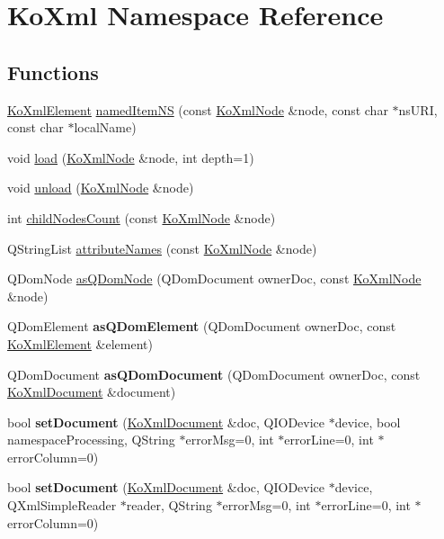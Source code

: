 \hypertarget{namespaceKoXml}{
\section{KoXml Namespace Reference}
\label{namespaceKoXml}
}
\subsection*{Functions}
\begin{DoxyCompactItemize}
\item 
\hyperlink{classKoXmlElement}{KoXmlElement} \hyperlink{namespaceKoXml_af571b501c9481cab08bbcf9b9174e4f5}{namedItemNS} (const \hyperlink{classKoXmlNode}{KoXmlNode} \&node, const char $\ast$nsURI, const char $\ast$localName)
\item 
void \hyperlink{namespaceKoXml_aaa2b101e7188f027c484537851115566}{load} (\hyperlink{classKoXmlNode}{KoXmlNode} \&node, int depth=1)
\item 
void \hyperlink{namespaceKoXml_a5834f749393cb5393257558484f8d2b9}{unload} (\hyperlink{classKoXmlNode}{KoXmlNode} \&node)
\item 
int \hyperlink{namespaceKoXml_a741654edec9f17c65760b32b45069dcc}{childNodesCount} (const \hyperlink{classKoXmlNode}{KoXmlNode} \&node)
\item 
QStringList \hyperlink{namespaceKoXml_a4859eaf343a885dc2c69889271e16b6a}{attributeNames} (const \hyperlink{classKoXmlNode}{KoXmlNode} \&node)
\item 
QDomNode \hyperlink{namespaceKoXml_aa9562d7b4abde19cd063e70ca966e582}{asQDomNode} (QDomDocument ownerDoc, const \hyperlink{classKoXmlNode}{KoXmlNode} \&node)
\item 
\hypertarget{namespaceKoXml_a9a009f9951bf7a5c4f1b83d6b1577bcc}{
QDomElement {\bfseries asQDomElement} (QDomDocument ownerDoc, const \hyperlink{classKoXmlElement}{KoXmlElement} \&element)}
\label{namespaceKoXml_a9a009f9951bf7a5c4f1b83d6b1577bcc}

\item 
\hypertarget{namespaceKoXml_aa4375111a0c208d32b1d7fa18ad59553}{
QDomDocument {\bfseries asQDomDocument} (QDomDocument ownerDoc, const \hyperlink{classKoXmlDocument}{KoXmlDocument} \&document)}
\label{namespaceKoXml_aa4375111a0c208d32b1d7fa18ad59553}

\item 
\hypertarget{namespaceKoXml_a9bdb283b140e57df55688bb3342dca07}{
bool {\bfseries setDocument} (\hyperlink{classKoXmlDocument}{KoXmlDocument} \&doc, QIODevice $\ast$device, bool namespaceProcessing, QString $\ast$errorMsg=0, int $\ast$errorLine=0, int $\ast$errorColumn=0)}
\label{namespaceKoXml_a9bdb283b140e57df55688bb3342dca07}

\item 
\hypertarget{namespaceKoXml_aea28cc56bb546ac838d55d863080b83e}{
bool {\bfseries setDocument} (\hyperlink{classKoXmlDocument}{KoXmlDocument} \&doc, QIODevice $\ast$device, QXmlSimpleReader $\ast$reader, QString $\ast$errorMsg=0, int $\ast$errorLine=0, int $\ast$errorColumn=0)}
\label{namespaceKoXml_aea28cc56bb546ac838d55d863080b83e}

\end{DoxyCompactItemize}



